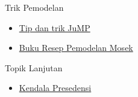 \begin{resource}
Trik Pemodelan
\begin{itemize}
\item \href{https://jump.dev/JuMP.jl/stable/tutorials/linear/tips_and_tricks/}{Tip dan trik JuMP}
\item \href{https://docs.mosek.com/modeling-cookbook/mio.html}{Buku Resep Pemodelan Mosek}
\end{itemize}


{Topik Lanjutan}
\begin{itemize}
\item \href{https://or.stackexchange.com/questions/1319/best-model-for-precedence-constraints-within-scheduling-problem}{Kendala Presedensi}
\end{itemize}
\end{resource}

%

